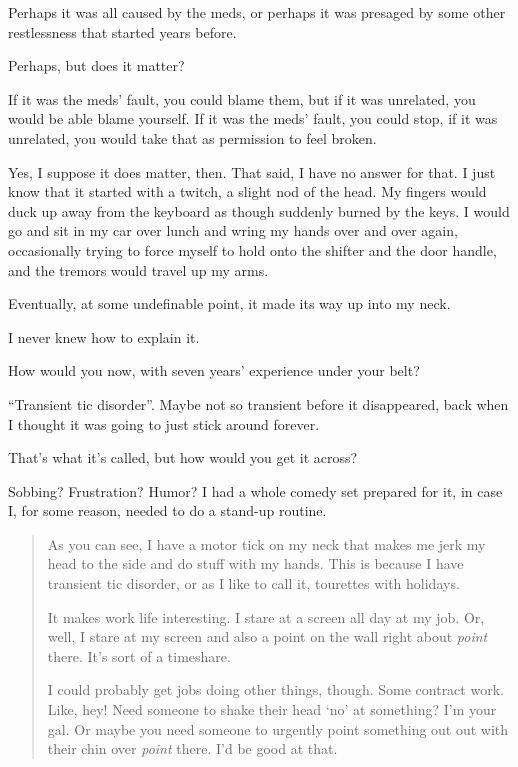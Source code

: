 \begin{paracol}{2}
\begin{leftcolumn}
\begin{ally}
Perhaps it was all caused by the meds, or perhaps it was presaged by some other restlessness that started years before.
\end{ally}
Perhaps, but does it matter?

\begin{ally}
If it was the meds' fault, you could blame them, but if it was unrelated, you would be able blame yourself. If it was the meds' fault, you could stop, if it was unrelated, you would take that as permission to feel broken.
\end{ally}
Yes, I suppose it does matter, then. That said, I have no answer for that. I just know that it started with a twitch, a slight nod of the head. My fingers would duck up away from the keyboard as though suddenly burned by the keys. I would go and sit in my car over lunch and wring my hands over and over again, occasionally trying to force myself to hold onto the shifter and the door handle, and the tremors would travel up my arms.

Eventually, at some undefinable point, it made its way up into my neck.

I never knew how to explain it.

\begin{ally}
How would you now, with seven years' experience under your belt?
\end{ally}
``Transient tic disorder''. Maybe not so transient before it disappeared, back when I thought it was going to just stick around forever.

\begin{ally}
That's what it's called, but how would you get it across?
\end{ally}
Sobbing? Frustration? Humor? I had a whole comedy set prepared for it, in case I, for some reason, needed to do a stand-up routine.

\begin{quotation}
\noindent As you can see, I have a motor tick on my neck that makes me jerk my head to the side and do stuff with my hands. This is because I have transient tic disorder, or as I like to call it, tourettes with holidays.

It makes work life interesting. I stare at a screen all day at my job. Or, well, I stare at my screen and also a point on the wall right about \emph{point} there. It's sort of a timeshare.

I could probably get jobs doing other things, though. Some contract work. Like, hey! Need someone to shake their head `no' at something? I'm your gal. Or maybe you need someone to urgently point something out out with their chin over \emph{point} there. I'd be good at that.


\end{quotation}
\end{leftcolumn}
\end{paracol}
